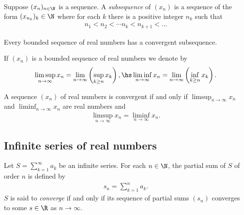 \documentclass{article}
\begin{document}
\begin{definition}[Notes 1.4]
    Suppose $(x_n)_{n\in\N}$ is a sequence. A \emph{subsequence} of $(x_n)$ is a sequence of the form
    $(x_{n_k})_k\in\N$ where for each $k$ there is a positive integer $n_k$ such that
    \begin{align*}
        n_1 < n_2 < \cdots n_k < n_{k+1} < ...
    \end{align*}
\end{definition}

\begin{theorem}
    Every bounded sequence of real numbers has a convergent subsequence. 
\end{theorem}

\begin{definition}[Notes 1.5]
    If $(x_n)$ is a bounded sequence of real numbers we denote by
    \begin{align*}
        \limsup_{n\to\infty} x_n = \lim_{n\to\infty}\left(\sup_{k\geq n}x_k\right),\hs
        \liminf_{n\to\infty} x_n = \lim_{n\to\infty}\left(\inf_{k\geq n}x_k\right).
    \end{align*} 
\end{definition}

\begin{theorem}[Notes 1.6]
    A sequence $(x_n)$ of real numbers is convergent if and only if $\limsup_{n\to\infty}x_n$
    and $\liminf_{n\to\infty}x_n$ are real numbers and
    \begin{align*}
        \limsup_{n\to\infty}x_n =\liminf_{n\to\infty} x_n.
    \end{align*}
\end{theorem}

\subsection{Infinite series of real numbers}

\begin{definition}[Notes 1.6]
    Let $S=\sum_{k=1}^\infty a_k$ be an infinite series. For each $n\in\N$, the partial
    sum of $S$ of order $n$ is defined by
    \begin{align*}
        s_n = \sum_{k=1}^n a_k. 
    \end{align*} 
    $S$ is said to \emph{converge} if and only if its sequence of partial sums $(s_n)$
    converges to some $s\in\R$ as $n\to\infty$.
\end{definition}
\end{document}
